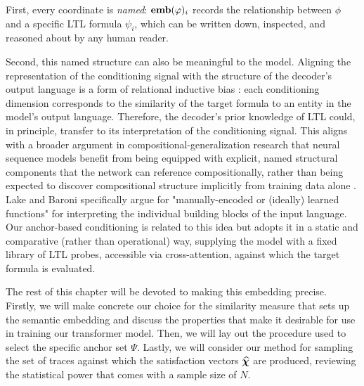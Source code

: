 \documentclass[titlepage,a4paper,11pt]{report}
\begin{document}
    First, every coordinate is \emph{named}: $\textbf{emb}(\varphi)_i$ records the relationship between $\phi$ and a specific LTL formula $\psi_i$, which can be written down, inspected, and reasoned about by any human reader. 
    
    Second, this named structure can also be meaningful to the model. Aligning the representation of the conditioning signal with the structure of the decoder's output language is a form of relational inductive bias \citep{battaglia_relational_2018}: each conditioning dimension corresponds to the similarity of the target formula to an entity in the model's output language. Therefore, the decoder's prior knowledge of LTL could, in principle, transfer to its interpretation of the conditioning signal. This aligns with a broader argument in compositional-generalization research that neural sequence models benefit from being equipped with explicit, named structural components that the network can reference compositionally, rather than being expected to discover compositional structure implicitly from training data alone \citep{lake_building_2017, lake_generalization_2018}. Lake and Baroni \citep{lake_generalization_2018} specifically argue for "manually-encoded or (ideally) learned functions" for interpreting the individual building blocks of the input language. Our anchor-based conditioning is related to this idea but adopts it in a static and comparative (rather than operational) way, supplying the model with a fixed library of LTL probes, accessible via cross-attention, against which the target formula is evaluated. 
    
    The rest of this chapter will be devoted to making this embedding precise. Firstly, we will make concrete our choice for the similarity measure that sets up the semantic embedding and discuss the properties that make it desirable for use in training our transformer model. Then, we will lay out the procedure used to select the specific anchor set $\Psi$. Lastly, we will consider our method for sampling the set of traces against which the satisfaction vectors $\bm{\widehat\chi}$ are produced, reviewing the statistical power that comes with a sample size of $N$.
\end{document}

